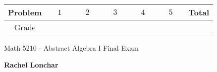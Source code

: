 \documentclass[10pt]{article}
\theoremstyle{Theorem}
\theoremstyle{definition}
\theoremstyle{remark}
\theoremstyle{custom}
\begin{document}
\pagestyle{empty}

\begin{center}
\renewcommand{\arraystretch}{2}
\begin{tabular}{|c||c|c|c|c|c||c|}
\hline 
Problem &$\quad 1 \quad $& $\quad 2 \quad $& $\quad 3 \quad $ & $\quad 4 \quad $ & $\quad 5 \quad $ & Total\\
\hline
Grade & & & & & & \\
\hline 
\end{tabular}
\end{center}

\begin{center}
Math 5210 - Abstract Algebra I  \hfill Final Exam
\end{center}


{\bf Rachel Lonchar} 


\bigskip
                       
\end{document}
